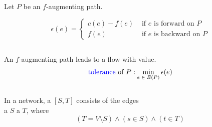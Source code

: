 \begin{frame}{}
  \begin{definition}
    Let $P$ be an $f$-augmenting path.

    \[
      \epsilon(e) = \begin{cases}
        c(e) - f(e) & \text{ if } e \text{ is forward on } P \\
        f(e)        & \text{ if } e \text{ is backward on } P
      \end{cases}
    \]
  \end{definition}

  \begin{columns}
  \end{columns}

  \pause
  \vspace{0.30cm}
  \begin{center}
    An $f$-augmenting path leads to a flow with  value.
    \[
      \text{\textcolor{blue}{tolerance} of } P: \min_{e \;\in\; E(P)} \epsilon(e)
    \]
  \end{center}
\end{frame}

\begin{frame}{}
  \begin{columns}
  \end{columns}

  \pause
  \vspace{0.80cm}
  \begin{columns}
      \pause
  \end{columns}
\end{frame}

\begin{frame}{}
  \begin{definition}
    In a network, a  $[S, T]$
    consists of the edges \\
     a  $S$  a  $T$, where
    \[
      (T = V \setminus S) \land (s \in S) \land (t \in T)
    \]
  \end{definition}

  \vspace{0.50cm}
\end{frame}

